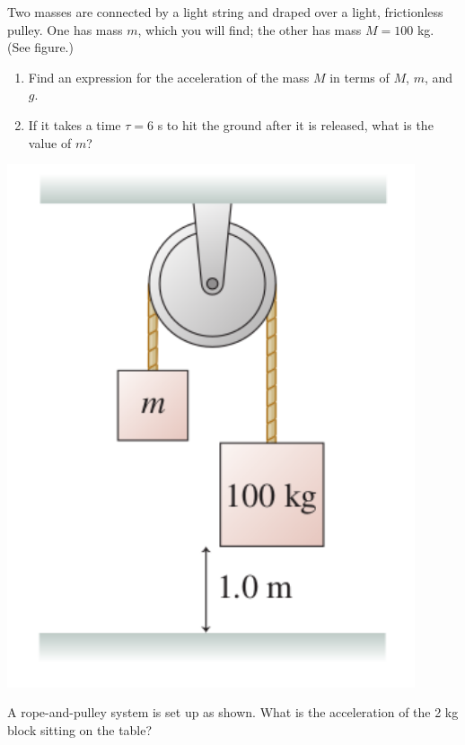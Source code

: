 \documentclass[12pt]{article}
\begin{document}
\begin{enumerate}
  \begin{minipage}{0.7\textwidth}
\item Two masses are connected by a light string and draped over a light, frictionless pulley. One has mass $m$, which you will find; the other has mass $M=100$ kg. (See figure.)
   
\begin{enumerate}
\item Find an expression for the acceleration of the mass $M$ in terms of $M$, $m$,
and $g$.
\item If it takes a time $\tau=6$ s to hit the ground after it is released, what is
the value of $m$? 
\end{enumerate}
  \end{minipage}
  \begin{minipage}{0.3\textwidth}
\centerline{\includegraphics[width=0.9\textwidth]{problem738.png}}
  \end{minipage}

  \begin{minipage}{0.6\textwidth}
\item A rope-and-pulley system is set up as shown. What is the acceleration of the 
2 kg block sitting on the table? 
   

\end{minipage}
\end{enumerate}
\end{document}

